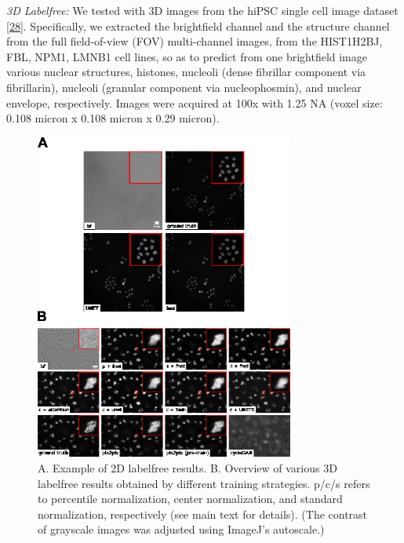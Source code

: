 \emph{3D Labelfree:} We tested with 3D images from the hiPSC single cell image dataset {[}\protect\hyperlink{ref-5sGcmDuy}{28}{]}. Specifically, we extracted the brightfield channel and the structure channel from the full field-of-view (FOV) multi-channel images, from the HIST1H2BJ, FBL, NPM1, LMNB1 cell lines, so as to predict from one brightfield image various nuclear structures, histones, nucleoli (dense fibrillar component via fibrillarin), nucleoli (granular component via nucleophosmin), and nuclear envelope, respectively. Images were acquired at 100x with 1.25 NA (voxel size: 0.108 micron x 0.108 micron x 0.29 micron).

\begin{figure}
\hypertarget{fig:labelfree_comparison}{%
\centering
\includegraphics[width=0.76\textwidth,height=0.9\textheight]{images/labelfree_comparison_justin.png}
\caption{A. Example of 2D labelfree results. B. Overview of various 3D labelfree results obtained by different training strategies. p/c/s refers to percentile normalization, center normalization, and standard normalization, respectively (see main text for details). (The contrast of grayscale images was adjusted using ImageJ's autoscale.)}\label{fig:labelfree_comparison}
}
\end{figure}

